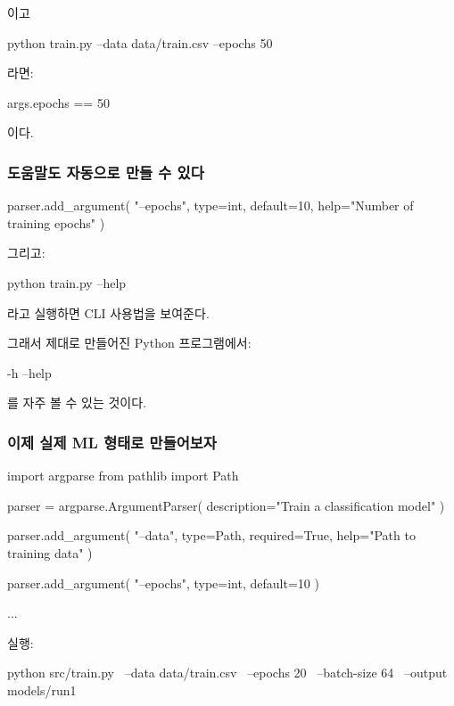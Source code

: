 이고

\begin{dhkzsh}
python train.py --data data/train.csv --epochs 50
\end{dhkzsh}

라면:

\begin{dhkcode}
args.epochs == 50
\end{dhkcode}

이다.

\subsubsection{도움말도 자동으로 만들 수 있다}

\begin{dhkcode}
parser.add_argument(
    "--epochs",
    type=int,
    default=10,
    help="Number of training epochs"
)
\end{dhkcode}

그리고:

\begin{dhkzsh}
python train.py --help
\end{dhkzsh}

라고 실행하면 CLI 사용법을 보여준다.

그래서 제대로 만들어진 Python 프로그램에서:

\begin{dhkzsh}
-h
--help
\end{dhkzsh}

를 자주 볼 수 있는 것이다.

\subsubsection{이제 실제 ML 형태로 만들어보자}

\begin{dhkcode}
import argparse
from pathlib import Path

parser = argparse.ArgumentParser(
    description="Train a classification model"
)

parser.add_argument(
    "--data",
    type=Path,
    required=True,
    help="Path to training data"
)

parser.add_argument(
    "--epochs",
    type=int,
    default=10
)

...
\end{dhkcode}

실행:

\begin{dhkzsh}
python src/train.py \
    --data data/train.csv \
    --epochs 20 \
    --batch-size 64 \
    --output models/run1
\end{dhkzsh}

